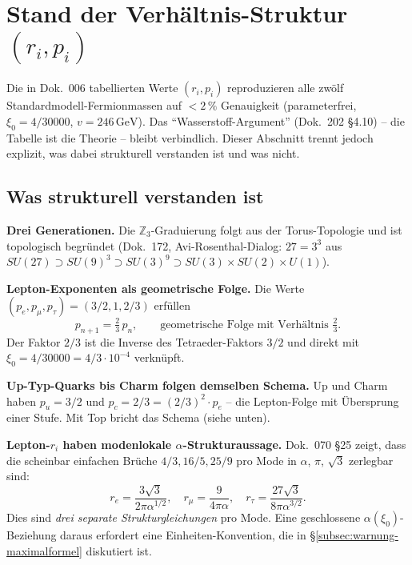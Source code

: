 \section{Stand der Verhältnis-Struktur \texorpdfstring{$(r_i, p_i)$}{(r_i, p_i)}}
\label{sec:stand-r-p}

Die in Dok.~006 tabellierten Werte $(r_i, p_i)$ reproduzieren alle
zwölf Standardmodell-Fermionmassen auf $<2\,\%$ Genauigkeit
(parameterfrei, $\xi_0 = 4/30000$, $v = 246\,\text{GeV}$). Das
\enquote{Wasserstoff-Argument} (Dok.~202 §4.10) -- die Tabelle ist
die Theorie -- bleibt verbindlich. Dieser Abschnitt trennt jedoch
explizit, was dabei strukturell verstanden ist und was nicht.

\subsection{Was strukturell verstanden ist}

\textbf{Drei Generationen.} Die $\mathbb{Z}_3$-Graduierung folgt
aus der Torus-Topologie und ist topologisch begründet (Dok.~172,
Avi-Rosenthal-Dialog: $27 = 3^3$ aus
$SU(27) \supset SU(9)^3 \supset SU(3)^9 \supset
SU(3) \times SU(2) \times U(1)$).

\textbf{Lepton-Exponenten als geometrische Folge.}
Die Werte $(p_e, p_\mu, p_\tau) = (3/2, 1, 2/3)$ erfüllen
\begin{equation}
  p_{n+1} = \tfrac{2}{3}\, p_n, \qquad
  \text{geometrische Folge mit Verhältnis } \tfrac{2}{3}.
\end{equation}
Der Faktor $2/3$ ist die Inverse des Tetraeder-Faktors $3/2$ und
direkt mit $\xi_0 = 4/30000 = 4/3 \cdot 10^{-4}$ verknüpft.

\textbf{Up-Typ-Quarks bis Charm folgen demselben Schema.}
Up und Charm haben $p_u = 3/2$ und $p_c = 2/3 = (2/3)^2 \cdot p_e$
-- die Lepton-Folge mit Übersprung einer Stufe. Mit Top bricht
das Schema (siehe unten).

\textbf{Lepton-$r_i$ haben modenlokale $\alpha$-Strukturaussage.}
Dok.~070 §25 zeigt, dass die scheinbar einfachen Brüche $4/3, 16/5,
25/9$ pro Mode in $\alpha$, $\pi$, $\sqrt{3}$ zerlegbar sind:
\begin{equation}
  r_e = \frac{3\sqrt{3}}{2\pi\alpha^{1/2}}, \quad
  r_\mu = \frac{9}{4\pi\alpha}, \quad
  r_\tau = \frac{27\sqrt{3}}{8\pi\alpha^{3/2}}.
\end{equation}
Dies sind \emph{drei separate Strukturgleichungen} pro Mode. Eine
geschlossene $\alpha(\xi_0)$-Beziehung daraus erfordert eine
Einheiten-Konvention, die in §\ref{subsec:warnung-maximalformel}
diskutiert ist.

